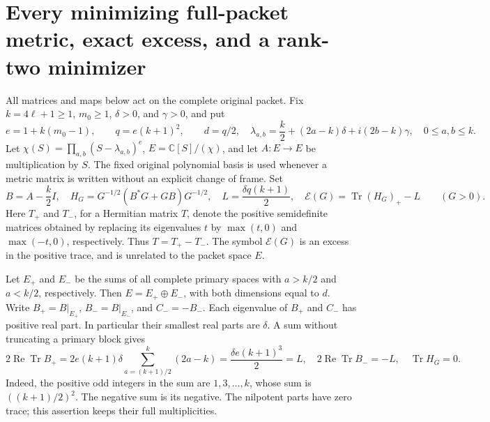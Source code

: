 
\section{Every minimizing full-packet metric, exact excess, and a rank-two minimizer}
\label{sec:pte}

All matrices and maps below act on the complete original packet.  Fix
\(k=4\ell+1\geq1\), \(m_0\geq1\), \(\delta>0\), and \(\gamma>0\), and put
\begin{equation}\tag{PTE1}\label{eq:pte1}
 e=1+k(m_0-1),\qquad q=e(k+1)^2,\qquad d=q/2,
 \quad \lambda_{a,b}=\frac{k}{2}+(2a-k)\delta+i(2b-k)\gamma,
 \quad 0\leq a,b\leq k.
\end{equation}
Let \(\chi(S)=\prod_{a,b}(S-\lambda_{a,b})^e\),
\(E=\mathbb C[S]/(\chi)\), and let \(A:E\longrightarrow E\) be multiplication
by \(S\).  The fixed original polynomial basis is used whenever a metric
matrix is written without an explicit change of frame.  Set
\begin{equation}\tag{PTE2}\label{eq:pte2}
 B=A-\frac{k}{2}I,
 \quad H_G=G^{-1/2}(B^*G+GB)G^{-1/2},
 \quad L=\frac{\delta q(k+1)}2,
 \quad \mathcal E(G)=\operatorname{Tr}(H_G)_+-L
 \qquad(G>0).
\end{equation}
Here \(T_+\) and \(T_-\), for a Hermitian matrix \(T\), denote the positive
semidefinite matrices obtained by replacing its eigenvalues \(t\) by
\(\max(t,0)\) and \(\max(-t,0)\), respectively.  Thus \(T=T_+-T_-\).
The symbol \(\mathcal E(G)\) is an excess in the positive trace, and is
unrelated to the packet space \(E\).

Let \(E_+\) and \(E_-\) be the sums of all complete primary spaces with
\(a>k/2\) and \(a<k/2\), respectively.  Then
\(E=E_+\oplus E_-\), with both dimensions equal to \(d\).  Write
\(B_+=B|_{E_+}\), \(B_-=B|_{E_-}\), and \(C_-=-B_-\).
Each eigenvalue of \(B_+\) and \(C_-\) has positive real part.  In
particular their smallest real parts are \(\delta\).  A sum without
truncating a primary block gives
\begin{equation}\tag{PTE3}\label{eq:pte3}
 2\operatorname{Re}\operatorname{Tr}B_+
 =2e(k+1)\delta\sum_{a=(k+1)/2}^{k}(2a-k)
 =\frac{\delta e(k+1)^3}{2}=L,
 \quad 2\operatorname{Re}\operatorname{Tr}B_-=-L,
 \quad \operatorname{Tr}H_G=0.
\end{equation}
Indeed, the positive odd integers in the sum are \(1,3,\ldots,k\), whose
sum is \(((k+1)/2)^2\).  The negative sum is its negative.  The nilpotent
parts have zero trace; this assertion keeps their full multiplicities.

